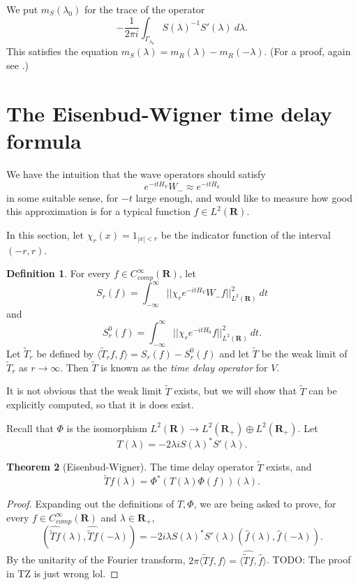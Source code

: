 \documentclass[12pt]{report}
\newcommand{\RR}{\mathbf{R}}
\newcommand{\dfn}[1]{\emph{#1}\index{#1}}
\theoremstyle{definition}
\newtheorem{theorem}{Theorem}[chapter]
\newtheorem{definition}[theorem]{Definition}
\begin{document}
We put $m_S(\lambda_0)$ for the trace of the operator
$$-\frac{1}{2\pi i} \int_{\Gamma_{\lambda_0}} S(\lambda)^{-1}S'(\lambda) ~d\lambda.$$
This satisfies the equation $m_S(\lambda) = m_R(\lambda) - m_R(-\lambda)$. (For a proof, again see \cite[Chapter 2]{dyatlov2019mathematical}.)



\section{The Eisenbud-Wigner time delay formula}
We have the intuition that the wave operators should satisfy
$$e^{-itH_V}W_- \approx e^{-itH_0}$$
in some suitable sense, for $-t$ large enough, and would like to measure how good this approximation is for a typical function $f \in L^2(\RR)$.

In this section, let $\chi_r(x) = 1_{|x| < r}$ be the indicator function of the interval $(-r,  r)$.
\begin{definition}
  For every $f \in C^\infty_{comp}(\RR)$, let
  $$S_r(f) = \int_{-\infty}^\infty ||\chi_r e^{-itH_V} W_-f||_{L^2(\RR)}^2 ~dt$$
  and
  $$S_r^0(f) = \int_{-\infty}^\infty ||\chi_r e^{-itH_0} f||_{L^2(\RR)}^2 ~dt.$$
  Let $\tilde T_r$ be defined by $\langle \tilde T_rf, f\rangle = S_r(f) - S_r^0(f)$ and let $\tilde T$ be the weak limit of $\tilde T_r$ as $r \to \infty$. Then $\tilde T$ is known as the \dfn{time delay operator} for $V$.
\end{definition}
It is not obvious that the weak limit $\tilde T$ exists, but we will show that $\tilde T$ can be explicitly computed, so that it is does exist.

Recall that $\Phi$ is the isomorphism $L^2(\RR) \to L^2(\RR_+) \oplus L^2(\RR_+)$. Let
$$T(\lambda) = -2\lambda iS(\lambda)^* S'(\lambda).$$

\begin{theorem}[Eisenbud-Wigner]
The time delay operator $\tilde T$ exists, and
$$\tilde Tf(\lambda) = \Phi^*(T(\lambda)\Phi(f))(\lambda).$$
\end{theorem}
\begin{proof}
Expanding out the definitions of $T,\Phi$, we are being asked to prove, for every $f \in C_{comp}^\infty(\RR)$ and $\lambda \in \RR_+$,
$$(\widehat{\tilde Tf}(\lambda), \widehat{\tilde Tf}(-\lambda)) = -2i\lambda S(\lambda)^* S'(\lambda)(\hat f(\lambda), \hat f(-\lambda)).$$
By the unitarity of the Fourier transform, $2\pi \langle \tilde Tf, f\rangle = \langle \widehat{\tilde Tf}, \hat f\rangle$.
TODO: The proof in TZ is just wrong lol.
\end{proof}
\end{document}

